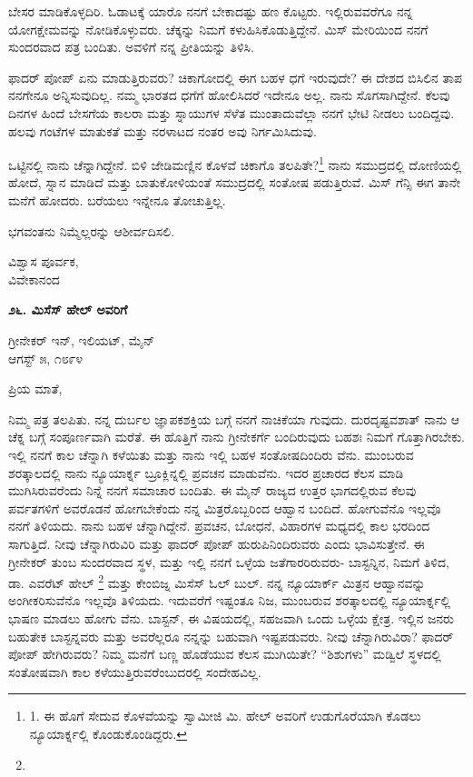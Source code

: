 ಬೇಸರ ಮಾಡಿಕೊಳ್ಳದಿರಿ. ಓಡಾಟಕ್ಕೆ ಯಾರೊ ನನಗೆ ಬೇಕಾದಷ್ಟು ಹಣ ಕೊಟ್ಟರು. ಇಲ್ಲಿರುವವರೆಗೂ ನನ್ನ ಯೋಗಕ್ಷೇಮವನ್ನು ನೋಡಿಕೊಳ್ಳುವರು. ಚೆಕ್ಕನ್ನು ನಿಮಗೆ ಕಳುಹಿಸಿಕೊಡುತ್ತಿದ್ದೇನೆ. ಮಿಸ್ ಮೇರಿಯಿಂದ ನನಗೆ ಸುಂದರವಾದ ಪತ್ರ ಬಂದಿತು. ಅವಳಿಗೆ ನನ್ನ ಪ್ರೀತಿಯನ್ನು ತಿಳಿಸಿ.

ಫಾದರ್ ಪೋಪ್ ಏನು ಮಾಡುತ್ತಿರುವರು? ಚಿಕಾಗೋದಲ್ಲಿ ಈಗ ಬಹಳ ಧಗೆ ಇರುವುದೇ? ಈ ದೇಶದ ಬಿಸಿಲಿನ ತಾಪ ನನಗೇನೂ ಅನ್ನಿಸುವುದಿಲ್ಲ. ನಮ್ಮ ಭಾರತದ ಧಗೆಗೆ ಹೋಲಿಸಿದರೆ ಇದೇನೂ ಅಲ್ಲ. ನಾನು ಸೊಗಸಾಗಿದ್ದೇನೆ. ಕೆಲವು ದಿನಗಳ ಹಿಂದೆ ಬೇಸಗೆಯ ಕಾಲರಾ ಮತ್ತು ಸ್ನಾಯುಗಳ ಸೆಳೆತ ಮುಂತಾದುವೆಲ್ಲಾ ನನಗೆ ಭೇಟಿ ನೀಡಲು ಬಂದಿದ್ದವು. ಹಲವು ಗಂಟೆಗಳ ಮಾತುಕತೆ ಮತ್ತು ನರಳಾಟದ ನಂತರ ಅವು ನಿರ್ಗಮಿಸಿದುವು.

ಒಟ್ಟಿನಲ್ಲಿ ನಾನು ಚೆನ್ನಾಗಿದ್ದೇನೆ. ಬಿಳಿ ಜೇಡಿಮಣ್ಣಿನ ಕೊಳವೆ ಚಿಕಾಗೊ ತಲಪಿತೇ?\footnote{1. ಈ ಹೊಗೆ ಸೇದುವ ಕೊಳವೆಯನ್ನು ಸ್ವಾಮೀಜಿ ಮಿ. ಹೇಲ್ ಅವರಿಗೆ ಉಡುಗೊರೆಯಾಗಿ ಕೊಡಲು ನ್ಯೂಯಾರ್ಕ್ನಲ್ಲಿ ಕೊಂಡುಕೊಂಡಿದ್ದರು.} ನಾನು ಸಮುದ್ರದಲ್ಲಿ ದೋಣಿಯಲ್ಲಿ ಹೋದೆ, ಸ್ನಾನ ಮಾಡಿದೆ ಮತ್ತು ಬಾತುಕೋಳಿಯಂತೆ ಸಮುದ್ರದಲ್ಲಿ ಸಂತೋಷ ಪಡುತ್ತಿರುವೆ. ಮಿಸ್ ಗೆನ್ಸಿ ಈಗ ತಾನೇ ಮನೆಗೆ ಹೋದರು. ಬರೆಯಲು ಇನ್ನೇನೂ ತೋಚುತ್ತಿಲ್ಲ.

ಭಗವಂತನು ನಿಮ್ಮೆಲ್ಲರನ್ನು ಆಶೀರ್ವದಿಸಲಿ.

\begin{flushright}
ವಿಶ್ವಾಸ ಪೂರ್ವಕ,\\ವಿವೇಕಾನಂದ
\end{flushright}

\begin{center}
\textbf{೨೬. ಮಿಸೆಸ್ ಹೇಲ್ ಅವರಿಗೆ}
\end{center}

\begin{flushright}
ಗ್ರೀನೇಕರ್ ಇನ್, ಇಲಿಯಟ್, ಮೈನ್\\ಆಗಸ್ಟ್ ೫, ೧೮೯೪
\end{flushright}

ಪ್ರಿಯ ಮಾತೆ,

ನಿಮ್ಮ ಪತ್ರ ತಲಪಿತು. ನನ್ನ ದುರ್ಬಲ ಜ್ಞಾಪಕಶಕ್ತಿಯ ಬಗ್ಗೆ ನನಗೆ ನಾಚಿಕೆಯಾ ಗುವುದು. ದುರದೃಷ್ಟವಶಾತ್ ನಾನು ಆ ಚೆಕ್ನ ಬಗ್ಗೆ ಸಂಪೂರ್ಣವಾಗಿ ಮರೆತೆ. ಈ ಹೊತ್ತಿಗೆ ನಾನು ಗ್ರೀನೇಕರ್ಗೆ ಬಂದಿರುವುದು ಬಹಶಃ ನಿಮಗೆ ಗೊತ್ತಾಗಿರಬೇಕು. ಇಲ್ಲಿ ನನಗೆ ಕಾಲ ಚೆನ್ನಾಗಿ ಕಳೆಯಿತು ಮತ್ತು ನಾನು ಇಲ್ಲಿ ಬಹಳ ಸಂತೋಷದಿಂದಿರು ವೆನು. ಮುಂಬರುವ ಶರತ್ಕಾಲದಲ್ಲಿ ನಾನು ನ್ಯೂಯಾರ್ಕ್ನ ಬ್ರೂಕ್ಲಿನ್ನಲ್ಲಿ ಪ್ರವಚನ ಮಾಡುವೆನು. ಇದರ ಪ್ರಚಾರದ ಕೆಲಸ ಮಾಡಿ ಮುಗಿಸಿರುವರೆಂದು ನಿನ್ನೆ ನನಗೆ ಸಮಾಚಾರ ಬಂದಿತು. ಈ ಮೈನ್ ರಾಜ್ಯದ ಉತ್ತರ ಭಾಗದಲ್ಲಿರುವ ಕೆಲವು ಪರ್ವತಗಳಿಗೆ ಅವರೊಡನೆ ಹೋಗಬೇಕೆಂದು ನನ್ನ ಮಿತ್ರರೊಬ್ಬರಿಂದ ಆಹ್ವಾನ ಬಂದಿದೆ. ಹೋಗುವೆನೊ ಇಲ್ಲವೊ ನನಗೆ ತಿಳಿಯದು. ನಾನು ಬಹಳ ಚೆನ್ನಾಗಿದ್ದೇನೆ. ಪ್ರವಚನ, ಬೋಧನೆ, ವಿಹಾರಗಳ ಮಧ್ಯದಲ್ಲಿ ಕಾಲ ಭರದಿಂದ ಸಾಗುತ್ತಿದೆ. ನೀವು ಚೆನ್ನಾಗಿರುವಿರಿ ಮತ್ತು ಫಾದರ್ ಪೋಪ್ ಹುರುಪಿನಿಂದಿರುವರು ಎಂದು ಭಾವಿಸುತ್ತೇನೆ. ಈ ಗ್ರೀನೇಕರ್ ತುಂಬ ಸುಂದರವಾದ ಸ್ಥಳ, ಮತ್ತು ಇಲ್ಲಿ ನನಗೆ ಒಳ್ಳೆಯ ಜತೆಗಾರರಿರುವರು- ಬಾಸ್ಟನ್ನಿನ, ನಿಮಗೆ ತಿಳಿದ, ಡಾ. ಎವರೆಟ್ ಹೇಲ್ \footnote{} ಮತ್ತು ಕೇಂಬಿಜ್ನ ಮಿಸೆಸ್ ಓಲ್ ಬುಲ್. ನನ್ನ ನ್ಯೂಯಾರ್ಕ್ ಮಿತ್ರನ ಆಹ್ವಾನವನ್ನು ಅಂಗೀಕರಿಸುವೆನೊ ಇಲ್ಲವೊ ತಿಳಿಯದು. ಇದುವರೆಗೆ ಇಷ್ಟಂತೂ ನಿಜ, ಮುಂಬರುವ ಶರತ್ಕಾಲದಲ್ಲಿ ನ್ಯೂಯಾರ್ಕ್ನಲ್ಲಿ ಭಾಷಣ ಮಾಡಲು ಹೋಗು ವೆನು. ಬಾಸ್ಟನ್, ಈ ವಿಷಯದಲ್ಲಿ, ಸಹಜವಾಗಿ ಒಂದು ಒಳ್ಳೆಯ ಕ್ಷೇತ್ರ. ಇಲ್ಲಿನ ಜನರು ಬಹುತೇಕ ಬಾಸ್ಟನ್ನವರು ಮತ್ತು ಅವರೆಲ್ಲರೂ ನನ್ನನ್ನು ಬಹುವಾಗಿ ಇಷ್ಟಪಡುವರು. ನೀವು ಚೆನ್ನಾಗಿರುವಿರಾ? ಫಾದರ್ ಪೋಪ್ ಹೇಗಿರುವರು? ನಿಮ್ಮ ಮನೆಗೆ ಬಣ್ಣ ಹೊಡೆಯುವ ಕೆಲಸ ಮುಗಿಯಿತೇ? “ಶಿಶುಗಳು” ಮಡ್ವಿಲೆ ಸ್ಥಳದಲ್ಲಿ ಸಂತೋಷವಾಗಿ ಕಾಲ ಕಳೆಯುತ್ತಿರುವರೆಂಬುದರಲ್ಲಿ ಸಂದೇಹವಿಲ್ಲ.

